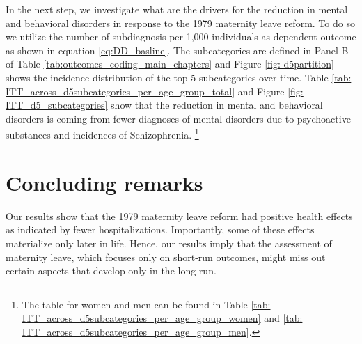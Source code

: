 \documentclass[11pt, a4paper]{article} %
\begin{document}
In the next step, we investigate what are the drivers for the reduction in mental and behavioral disorders in response to the 1979 maternity leave reform. To do so we utilize the number of subdiagnosis per 1,000 individuals as dependent outcome as shown in equation \ref{eq:DD_basline}. The subcategories are defined in Panel B of Table \ref{tab:outcomes_coding_main_chapters} and Figure \ref{fig: d5partition} shows the incidence distribution of the top 5 subcategories over time. Table \ref{tab: ITT_across_d5subcategories_per_age_group_total} and Figure \ref{fig: ITT_d5_subcategories} show that the reduction in mental and behavioral disorders is coming from fewer diagnoses of mental disorders due to psychoactive substances and incidences of Schizophrenia. \footnote{The table for women and men can be found in Table \ref{tab: ITT_across_d5subcategories_per_age_group_women} and \ref{tab: ITT_across_d5subcategories_per_age_group_men}.}






















\section{Concluding remarks}\label{sec:conclusion}

Our results show that the 1979 maternity leave reform had positive health effects as indicated by fewer hospitalizations. Importantly, some of these effects materialize only later in life. Hence, our results imply that the assessment of maternity leave, which focuses only on short-run outcomes, might miss out certain aspects that develop only in the long-run.

 
\end{document}
